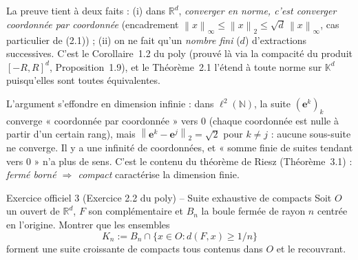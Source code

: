 \documentclass[11pt,a4paper]{article}
\newcommand{\R}{\mathbb{R}}
\newcommand{\N}{\mathbb{N}}
\newcommand{\K}{\mathbb{K}}
\newcommand{\norm}[1]{\left\|#1\right\|}
\theoremstyle{definition}
\begin{document}
\begin{pointcle}
La preuve tient à deux faits : (i) dans $\R^d$, \emph{converger en norme, c'est converger coordonnée par coordonnée} (encadrement $\norm x_\infty\le\norm x_2\le\sqrt d\,\norm x_\infty$, cas particulier de (2.1)) ; (ii) on ne fait qu'un \emph{nombre fini} ($d$) d'extractions successives. C'est le Corollaire~1.2 du poly (prouvé là via la compacité du produit $[-R,R]^d$, Proposition~1.9), et le Théorème~2.1 l'étend à toute norme sur $\K^d$ puisqu'elles sont toutes équivalentes.
\end{pointcle}

\begin{piege}
L'argument s'effondre en dimension infinie : dans $\ell^2(\N)$, la suite $(\mathbf e^k)_k$ converge « coordonnée par coordonnée » vers $0$ (chaque coordonnée est nulle à partir d'un certain rang), mais $\norm{\mathbf e^k-\mathbf e^j}_2=\sqrt2$ pour $k\ne j$ : aucune sous-suite ne converge. Il y a une infinité de coordonnées, et « somme finie de suites tendant vers $0$ » n'a plus de sens. C'est le contenu du théorème de Riesz (Théorème~3.1) : \emph{fermé borné $\Rightarrow$ compact} caractérise la dimension finie.
\end{piege}

\begin{exo}{Exercice officiel 3 (Exercice 2.2 du poly) -- Suite exhaustive de compacts}
Soit $O$ un ouvert de $\R^d$, $F$ son complémentaire et $B_n$ la boule fermée de rayon $n$ centrée en l'origine. Montrer que les ensembles
\[
K_n:=B_n\cap\{x\in O : d(F,x)\ge1/n\}
\]
forment une suite croissante de compacts tous contenus dans $O$ et le recouvrant.
\end{exo}
\end{document}
